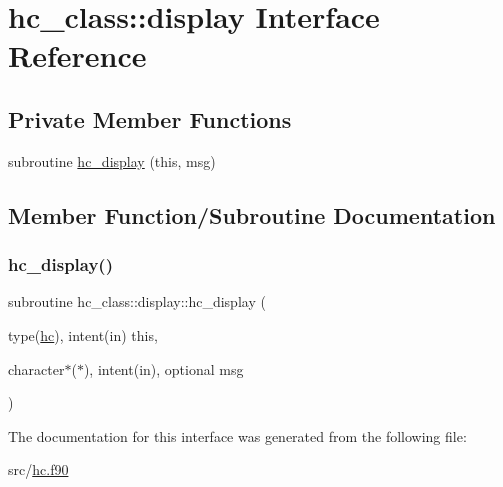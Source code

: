 \hypertarget{interfacehc__class_1_1display}{}\section{hc\+\_\+class\+:\+:display Interface Reference}
\label{interfacehc__class_1_1display}
\subsection*{Private Member Functions}
\begin{DoxyCompactItemize}
\item 
subroutine \hyperlink{interfacehc__class_1_1display_a319cf8e35b038638641be5c2b4510eb4}{hc\+\_\+display} (this, msg)
\end{DoxyCompactItemize}


\subsection{Member Function/\+Subroutine Documentation}
\mbox{\label{interfacehc__class_1_1display_a319cf8e35b038638641be5c2b4510eb4}} 
\subsubsection{\texorpdfstring{hc\+\_\+display()}{hc\_display()}}
{\footnotesize\ttfamily subroutine hc\+\_\+class\+::display\+::hc\+\_\+display (\begin{DoxyParamCaption}\item[{type(\hyperlink{structhc__class_1_1hc}{hc}), intent(in)}]{this,  }\item[{character$\ast$($\ast$), intent(in), optional}]{msg }\end{DoxyParamCaption})\hspace{0.3cm}{\ttfamily [private]}}



The documentation for this interface was generated from the following file\+:\begin{DoxyCompactItemize}
\item 
src/\hyperlink{hc_8f90}{hc.\+f90}\end{DoxyCompactItemize}
